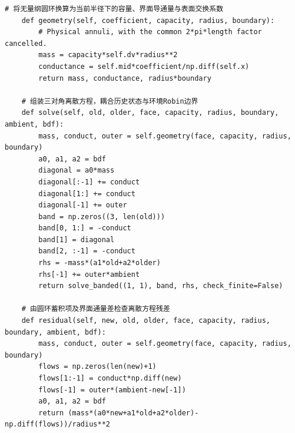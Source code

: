 \begin{Verbatim}[fontsize=\scriptsize,breaklines=true,breakanywhere=true]
    # 将无量纲圆环换算为当前半径下的容量、界面导通量与表面交换系数
    def geometry(self, coefficient, capacity, radius, boundary):
        # Physical annuli, with the common 2*pi*length factor cancelled.
        mass = capacity*self.dv*radius**2
        conductance = self.mid*coefficient/np.diff(self.x)
        return mass, conductance, radius*boundary

    # 组装三对角离散方程，耦合历史状态与环境Robin边界
    def solve(self, old, older, face, capacity, radius, boundary, ambient, bdf):
        mass, conduct, outer = self.geometry(face, capacity, radius, boundary)
        a0, a1, a2 = bdf
        diagonal = a0*mass
        diagonal[:-1] += conduct
        diagonal[1:] += conduct
        diagonal[-1] += outer
        band = np.zeros((3, len(old)))
        band[0, 1:] = -conduct
        band[1] = diagonal
        band[2, :-1] = -conduct
        rhs = -mass*(a1*old+a2*older)
        rhs[-1] += outer*ambient
        return solve_banded((1, 1), band, rhs, check_finite=False)

    # 由圆环蓄积项及界面通量差检查离散方程残差
    def residual(self, new, old, older, face, capacity, radius, boundary, ambient, bdf):
        mass, conduct, outer = self.geometry(face, capacity, radius, boundary)
        flows = np.zeros(len(new)+1)
        flows[1:-1] = conduct*np.diff(new)
        flows[-1] = outer*(ambient-new[-1])
        a0, a1, a2 = bdf
        return (mass*(a0*new+a1*old+a2*older)-np.diff(flows))/radius**2


\end{Verbatim}
